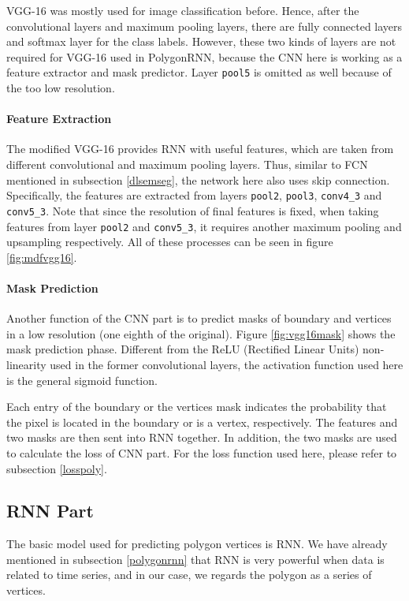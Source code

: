 

VGG-16 was mostly used for image classification before. Hence, after the convolutional layers and maximum pooling layers, there are fully connected layers and softmax layer for the class labels. However, these two kinds of layers are not required for VGG-16 used in PolygonRNN, because the CNN here is working as a feature extractor and mask predictor. Layer \lstinline{pool5} is omitted as well because of the too low resolution.

\paragraph{Feature Extraction} The modified VGG-16 provides RNN with useful features, which are taken from different convolutional and maximum pooling layers. Thus, similar to FCN mentioned in subsection \ref{dlsemseg}, the network here also uses skip connection. Specifically, the features are extracted from layers \lstinline{pool2}, \lstinline{pool3}, \lstinline{conv4_3} and \lstinline{conv5_3}. Note that since the resolution of final features is fixed, when taking features from layer \lstinline{pool2} and \lstinline{conv5_3}, it requires another maximum pooling and upsampling respectively. All of these processes can be seen in figure \ref{fig:mdfvgg16}.



\paragraph{Mask Prediction}
Another function of the CNN part is to predict masks of boundary and vertices in a low resolution (one eighth of the original). Figure \ref{fig:vgg16mask} shows the mask prediction phase. Different from the ReLU (Rectified Linear Units) \cite{relu} non-linearity used in the former convolutional layers, the activation function used here is the general sigmoid function.



Each entry of the boundary or the vertices mask indicates the probability that the pixel is located in the boundary or is a vertex, respectively. The features and two masks are then sent into RNN together. In addition, the two masks are used to calculate the loss of CNN part. For the loss function used here, please refer to subsection \ref{losspoly}.

\subsection{RNN Part}\label{modrnn}
The basic model used for predicting polygon vertices is RNN. We have already mentioned in subsection \ref{polygonrnn} that RNN is very powerful when data is related to time series, and in our case, we regards the polygon as a series of vertices.

